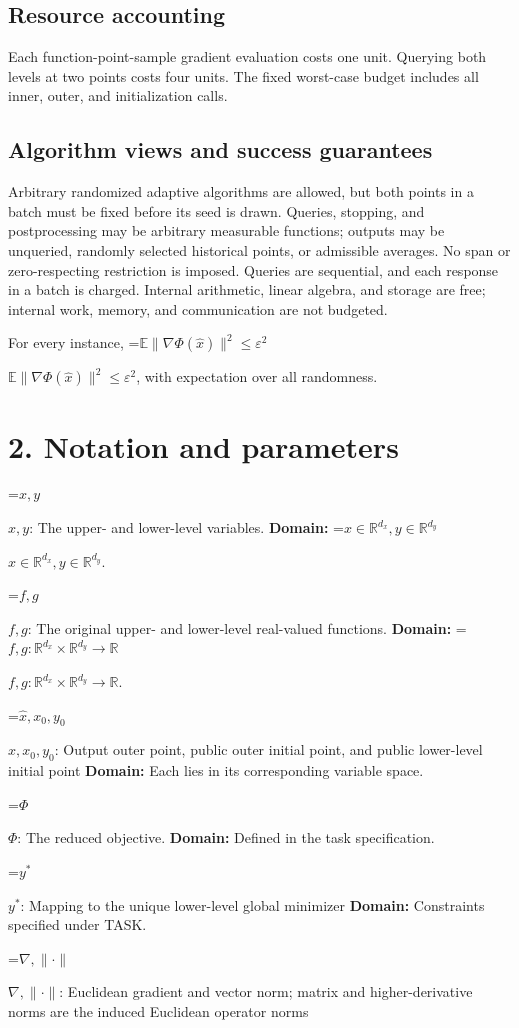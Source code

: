 \documentclass[10pt,a4paper]{article}
\newcommand{\AtlasMath}[1]{\par\begingroup\centering\setbox0=\hbox{$\displaystyle #1$}\ifdim\wd0>1.4\linewidth\typeout{ATLAS WIDE FORMULA: \the\wd0}\fi\ifdim\wd0>\linewidth\resizebox{\linewidth}{!}{\box0}\else\box0\fi\par\endgroup}
\newcommand{\AtlasInlineMath}[1]{\begingroup\setbox0=\hbox{$#1$}\ifdim\wd0>.4\linewidth\endgroup\AtlasMath{#1}\else\endgroup$#1$\fi}
\begin{document}
\subsection{Resource accounting}
Each function-point-sample gradient evaluation costs one unit. Querying both levels at two points costs four units. The fixed worst-case budget includes all inner, outer, and initialization calls.

\subsection{Algorithm views and success guarantees}
Arbitrary randomized adaptive algorithms are allowed, but both points in a batch must be fixed before its seed is drawn. Queries, stopping, and postprocessing may be arbitrary measurable functions; outputs may be unqueried, randomly selected historical points, or admissible averages. No span or zero-respecting restriction is imposed. Queries are sequential, and each response in a batch is charged. Internal arithmetic, linear algebra, and storage are free; internal work, memory, and communication are not budgeted.

For every instance, \AtlasInlineMath{\mathbb E\|\nabla\Phi(\widehat x)\|^2\le\varepsilon^2}, with expectation over all randomness.

\section{2. Notation and parameters}
\AtlasInlineMath{x,y}: The upper- and lower-level variables. \textbf{Domain:} \AtlasInlineMath{x\in\mathbb R^{d_x},y\in\mathbb R^{d_y}}.

\AtlasInlineMath{f,g}: The original upper- and lower-level real-valued functions. \textbf{Domain:} \AtlasInlineMath{f,g:\mathbb R^{d_x}\times\mathbb R^{d_y}\to\mathbb R}.

\AtlasInlineMath{\widehat x,x_0,y_0}: Output outer point, public outer initial point, and public lower-level initial point \textbf{Domain:} Each lies in its corresponding variable space.

\AtlasInlineMath{\Phi}: The reduced objective. \textbf{Domain:} Defined in the task specification.

\AtlasInlineMath{y^*}: Mapping to the unique lower-level global minimizer \textbf{Domain:} Constraints specified under TASK.

\AtlasInlineMath{\nabla,\|\cdot\|}: Euclidean gradient and vector norm; matrix and higher-derivative norms are the induced Euclidean operator norms
\end{document}
